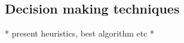 \subsection{Decision making techniques}
\label{sec:decisions}

* present heuristics, best algorithm etc *